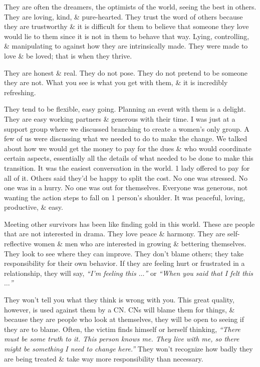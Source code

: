 \documentclass{article}
\numberwithin{equation}{section}
\begin{document}
They are often the dreamers, the optimists of the world, seeing the best in others. They are loving, kind, \& pure-hearted. They trust the word of others because they are trustworthy \& it is difficult for them to believe that someone they love would lie to them since it is not in them to behave that way. Lying, controlling, \& manipulating to against how they are intrinsically made. They were made to love \& be loved; that is when they thrive.

They are honest \& real. They do not pose. They do not pretend to be someone they are not. What you see is what you get with them, \& it is incredibly refreshing.

They tend to be flexible, easy going. Planning an event with them is a delight. They are easy working partners \& generous with their time. I was just at a support group where we discussed branching to create a women's only group. A few of us were discussing what we needed to do to make the change. We talked about how we would get the money to pay for the dues \& who would coordinate certain aspects, essentially all the details of what needed to be done to make this transition. It was the easiest conversation in the world. 1 lady offered to pay for all of it. Others said they'd be happy to split the cost. No one was stressed. No one was in a hurry. No one was out for themselves. Everyone was generous, not wanting the action steps to fall on 1 person's shoulder. It was peaceful, loving, productive, \& easy.

Meeting other survivors has been like finding gold in this world. These are people that are not interested in drama. They love peace \& harmony. They are self-reflective women \& men who are interested in growing \& bettering themselves. They look to see where they can improve. They don't blame others; they take responsibility for their own behavior. If they are feeling hurt or frustrated in a relationship, they will say, \textit{``I'm feeling this $\ldots$''} or \textit{``When you said that I felt this $\ldots$''}

They won't tell you what they think is wrong with you. This great quality, however, is used against them by a CN. CNs will blame them for things, \& because they are people who look at themselves, they will be open to seeing if they are to blame. Often, the victim finds himself or herself thinking, \textit{``There must be some truth to it. This person knows me. They live with me, so there might be something I need to change here.''} They won't recognize how badly they are being treated \& take way more responsibility than necessary.
\end{document}
